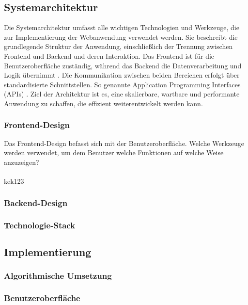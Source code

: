 \subsection{Systemarchitektur}
Die Systemarchitektur umfasst alle wichtigen Technologien und Werkzeuge, die zur Implementierung der Webanwendung verwendet werden. Sie beschreibt die grundlegende Struktur der Anwendung, einschließlich der Trennung zwischen Frontend und Backend und deren Interaktion. Das Frontend ist für die Benutzeroberfläche zuständig, während das Backend die Datenverarbeitung und Logik übernimmt \parencite{mccartney-2024}. Die Kommunikation zwischen beiden Bereichen erfolgt über standardisierte Schnittstellen. So genannte Application Programming Interfaces (APIs) \parencite{gazarov-2019}. Ziel der Architektur ist es, eine skalierbare, wartbare und performante Anwendung zu schaffen, die effizient weiterentwickelt werden kann.
\subsubsection{Frontend-Design}
Das Frontend-Design befasst sich mit der Benutzeroberfläche. Welche Werkzeuge werden verwendet, um dem Benutzer welche Funktionen auf welche Weise anzuzeigen? \parencite{mccartney-2024}\\\\
kek123  
\subsubsection{Backend-Design}
\subsubsection{Technologie-Stack}
\subsection{Implementierung}
\subsubsection{Algorithmische Umsetzung}
\subsubsection{Benutzeroberfläche}